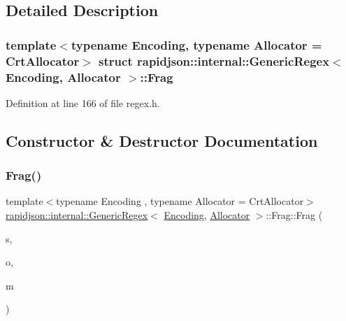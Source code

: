 \subsection{Detailed Description}
\subsubsection*{template$<$typename Encoding, typename Allocator = Crt\+Allocator$>$\newline
struct rapidjson\+::internal\+::\+Generic\+Regex$<$ Encoding, Allocator $>$\+::\+Frag}



Definition at line 166 of file regex.\+h.



\subsection{Constructor \& Destructor Documentation}
\mbox{\label{structrapidjson_1_1internal_1_1_generic_regex_1_1_frag_a4c77c5aef6eba12caecc5f3cd107a952}} 
\subsubsection{\texorpdfstring{Frag()}{Frag()}}
{\footnotesize\ttfamily template$<$typename Encoding , typename Allocator  = Crt\+Allocator$>$ \\
\mbox{\hyperlink{classrapidjson_1_1internal_1_1_generic_regex}{rapidjson\+::internal\+::\+Generic\+Regex}}$<$ \mbox{\hyperlink{classrapidjson_1_1_encoding}{Encoding}}, \mbox{\hyperlink{classrapidjson_1_1_allocator}{Allocator}} $>$\+::Frag\+::\+Frag (\begin{DoxyParamCaption}\item[{\mbox{\hyperlink{namespacerapidjson_a44eb33eaa523e36d466b1ced64b85c84}{Size\+Type}}}]{s,  }\item[{\mbox{\hyperlink{namespacerapidjson_a44eb33eaa523e36d466b1ced64b85c84}{Size\+Type}}}]{o,  }\item[{\mbox{\hyperlink{namespacerapidjson_a44eb33eaa523e36d466b1ced64b85c84}{Size\+Type}}}]{m }\end{DoxyParamCaption})}



